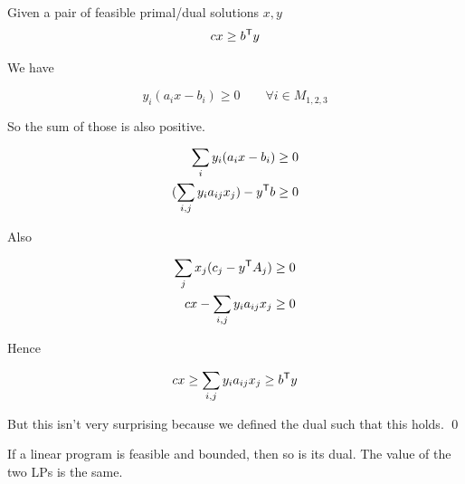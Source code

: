 \begin{thm}\label{thm:weakDuality} Given a pair of feasible primal/dual solutions $x,y$
\[cx \geq  {b}^\text{\upshape \sffamily T} y\]
\end{thm}

\begin{pr} We have

\[y_i(a_ix-b_i) \geq 0 \qquad \forall i\in M_{1,2,3}\]


So the sum of those is also positive.

\begin{align*}
\sum_i y_i(a_ix-b_i) &\geq 0\\
(\sum_{i,j}y_ia_{ij}x_j)-{y}^\text{\upshape \sffamily T}b &\geq 0
\end{align*}

Also 

\begin{align*}
\sum_j x_j(c_j-{y}^\text{\upshape \sffamily T}A_j) & \geq 0\\
cx - \sum_{i,j} y_i a_{ij} x_j &\geq 0
\end{align*}

Hence

\[cx \geq \sum_{i,j} y_i a_{ij} x_j \geq {b}^\text{\upshape \sffamily T} y\]

But this isn't very surprising because we defined the dual such that this holds.
\qed \end{pr}

\begin{thm}\label{thm:strongDuality} If a linear program is feasible and bounded, then so is its dual. The value of the two LPs is the same. \end{thm}

